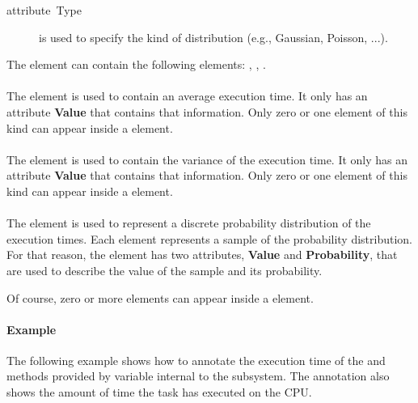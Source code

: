\begin{description}
\item [{attribute~Type}] is used to specify the kind of distribution
  (e.g., Gaussian, Poisson, ...).
\end{description}

The  element can contain the following elements:
, , .


\paragraph{}

The  element is used to contain an average execution time.
It only has an attribute \textbf{Value} that contains that
information.  Only zero or one element of this kind can appear inside
a  element.


\paragraph{}

The  element is used to contain the variance of the
execution time. It only has an attribute \textbf{Value} that contains
that information. Only zero or one element of this kind can appear
inside a  element.


\paragraph{}

The  element is used to represent a discrete probability
distribution of the execution times. Each  element
represents a sample of the probability distribution. For that reason,
the element has two attributes, \textbf{Value} and
\textbf{Probability}, that are used to describe the value of the
sample and its probability.

Of course, zero or more  elements can appear inside a
 element.


\paragraph{Example}

The following example shows how to annotate the execution time of the
 and  methods provided by variable
 internal to the  subsystem. The annotation
also shows the amount of time the  task has executed on
the CPU.

